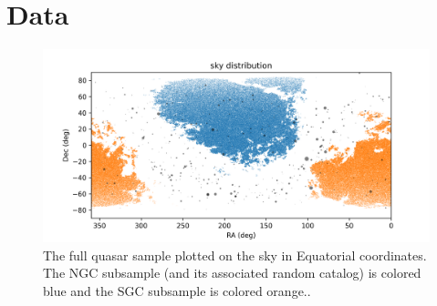 \documentclass[modern]{aastex631}
\newlength{\widefigurewidth}
\newlength{\figurewidth}
\begin{document}
\section{Data}

\begin{figure}[t!]
  \begin{mdframed}
  \color{captiongray}
  \begin{center}
    \includegraphics[width=\widefigurewidth]{notebooks/radec.png}
  \end{center}
    \caption{The full quasar sample plotted on the sky in Equatorial coordinates.
    The NGC subsample (and its associated random catalog) is colored blue and the SGC subsample is colored orange.\label{fig:radec}.}
  \end{mdframed}
\end{figure}
\end{document}
